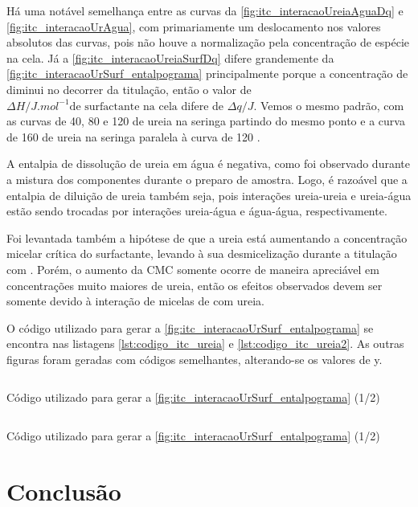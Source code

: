 	Há uma notável semelhança entre as curvas da \autoref{fig:itc_interacaoUreiaAguaDq} e \autoref{fig:itc_interacaoUrAgua}, com primariamente um deslocamento nos valores absolutos das curvas, pois não houve a normalização pela concentração de espécie na cela. Já a \autoref{fig:itc_interacaoUreiaSurfDq} difere grandemente da \autoref{fig:itc_interacaoUrSurf_entalpograma} principalmente porque a concentração de \TTAB{} diminui no decorrer da titulação, então o valor de \(\Delta H/J.mol^{-1} \text{de surfactante na cela}\) difere de \(\Delta q/J\). Vemos o mesmo padrão, com as curvas de 40, 80 e 120 \mM{} de ureia na seringa partindo do mesmo ponto e a curva de 160 \mM{} de ureia na seringa paralela à curva de 120 \mM.
	
	
	A entalpia de dissolução de ureia em água é negativa, como foi observado durante a mistura dos componentes durante o preparo de amostra. Logo, é razoável que a entalpia de diluição de ureia também seja, pois interações ureia-ureia e ureia-água estão sendo trocadas por interações ureia-água e água-água, respectivamente.
	
	
	Foi levantada também a hipótese de que a ureia está aumentando a concentração micelar crítica do surfactante, levando à sua desmicelização durante a titulação com \TTAB{}. Porém, o aumento da CMC somente ocorre de maneira apreciável em concentrações muito maiores de ureia, então os efeitos observados devem ser somente devido à interação de micelas de \TTAB{} com ureia.
	
	O código utilizado para gerar a \autoref{fig:itc_interacaoUrSurf_entalpograma} se encontra nas listagens \ref{lst:codigo_itc_ureia} e \ref{lst:codigo_itc_ureia2}. As outras figuras foram geradas com códigos semelhantes, alterando-se os valores de y.
	
	\begin{listing}[h]
		\inputminted{python}{./python/ITC_tratamento_ureia_ttab.py}
		\caption{Código utilizado para gerar a \autoref{fig:itc_interacaoUrSurf_entalpograma} (1/2)}
		\label{lst:codigo_itc_ureia}
	\end{listing}

	\begin{listing}[h]
		\inputminted{python}{./python/ITC_tratamento_ureia_ttab2.py}
		\caption{Código utilizado para gerar a \autoref{fig:itc_interacaoUrSurf_entalpograma} (1/2)}
		\label{lst:codigo_itc_ureia2}
	\end{listing}

	\section{Conclusão}
